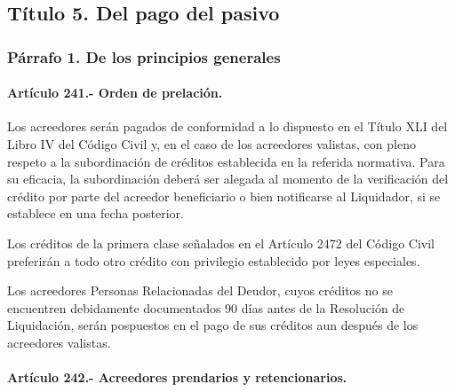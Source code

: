 \documentclass[
]{book}
\begin{document}
\hypertarget{tuxedtulo-5.-del-pago-del-pasivo}{%
\subsection*{Título 5. Del pago del pasivo}\label{tuxedtulo-5.-del-pago-del-pasivo}}

\hypertarget{puxe1rrafo-1.-de-los-principios-generales}{%
\subsubsection*{Párrafo 1. De los principios generales}\label{puxe1rrafo-1.-de-los-principios-generales}}

\hypertarget{artuxedculo-241.--orden-de-prelaciuxf3n.}{%
\paragraph*{Artículo 241.- Orden de prelación.}\label{artuxedculo-241.--orden-de-prelaciuxf3n.}}

Los acreedores serán pagados de conformidad a lo dispuesto en el Título XLI del Libro IV del Código Civil y, en el caso de los acreedores valistas, con pleno respeto a la subordinación de créditos establecida en la referida normativa. Para su eficacia, la subordinación deberá ser alegada al momento de la verificación del crédito por parte del acreedor beneficiario o bien notificarse al Liquidador, si se establece en una fecha posterior.

Los créditos de la primera clase señalados en el Artículo 2472 del Código Civil preferirán a todo otro crédito con privilegio establecido por leyes especiales.

Los acreedores Personas Relacionadas del Deudor, cuyos créditos no se encuentren debidamente documentados 90 días antes de la Resolución de Liquidación, serán pospuestos en el pago de sus créditos aun después de los acreedores valistas.

\hypertarget{artuxedculo-242.--acreedores-prendarios-y-retencionarios.}{%
\paragraph*{Artículo 242.- Acreedores prendarios y retencionarios.}\label{artuxedculo-242.--acreedores-prendarios-y-retencionarios.}}
\end{document}
